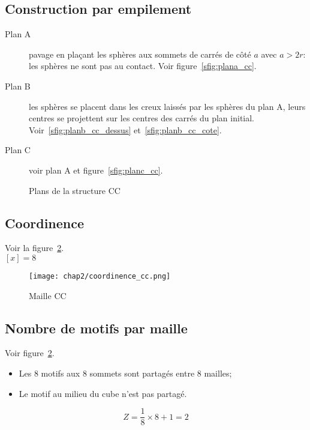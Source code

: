 \subsection{Construction par empilement}
\begin{description}
    \item[Plan A] pavage en plaçant les sphères aux sommets de carrés
        de côté $a$ avec $a>2r$: les sphères ne sont pas au contact.
        Voir figure~\ref{sfig:plana_cc}.
    \item[Plan B] les sphères se placent dans les creux laissés par 
        les sphères du plan A, leurs centres se projettent sur
        les centres des carrés du plan initial.
        Voir~\ref{sfig:planb_cc_dessus} et~\ref{sfig:planb_cc_cote}.
    \item[Plan C] voir plan A et figure~\ref{sfig:planc_cc}.
\end{description}
\begin{figure}
    \qquad
    \qquad
    \qquad
    \caption{Plans de la structure CC}\label{plans_cc}
\end{figure}

\subsection{Coordinence}
Voir la figure~\ref{fig:coordinence_cc}.\\
$[x] = 8$
\begin{figure}
    \centering
    \texttt{[image: chap2/coordinence\_cc.png]}
    \caption{Maille CC}\label{fig:coordinence_cc}
\end{figure}

\subsection{Nombre de motifs par maille}
Voir figure~\ref{fig:coordinence_cc}.
\begin{itemize}
    \item Les 8 motifs aux 8 sommets sont partagés entre 8 mailles;
    \item Le motif au milieu du cube n'est pas partagé.
\end{itemize}
\begin{equation}
    Z = \frac{1}{8} \times 8 + 1 = 2
\end{equation}

